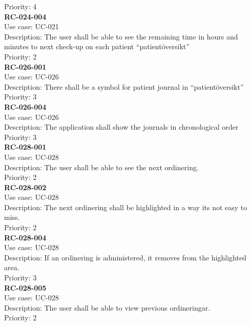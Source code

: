 Priority: 4 \\
\newline
\textbf{RC-024-004} \\
Use case: UC-021 \\
Description: The user shall be able to see the remaining time in hours and minutes to next check-up on each patient “patientöversikt” \\
Priority: 2 \\
\newline
\textbf{RC-026-001} \\
Use case: UC-026 \\
Description: There shall be a symbol for patient journal in “patientöversikt” \\
Priority: 3 \\
\newline
\textbf{RC-026-004} \\
Use case: UC-026 \\
Description: The application shall show the journals in chronological order\\
Priority: 3 \\
\newline
\textbf{RC-028-001} \\
Use case: UC-028 \\
Description: The user shall be able to see the next ordinering.\\
Priority: 2 \\
\newline
\textbf{RC-028-002} \\
Use case: UC-028 \\
Description: The next ordinering shall be highlighted in a way its not easy to miss.\\
Priority: 2 \\
\newline
\textbf{RC-028-004} \\
Use case: UC-028 \\
Description: If an ordinering is administered, it removes from the highlighted area.\\
Priority: 3 \\
\newline
\textbf{RC-028-005} \\
Use case: UC-028 \\
Description: The user shall be able to view previous ordineringar.\\
Priority: 2 \\


